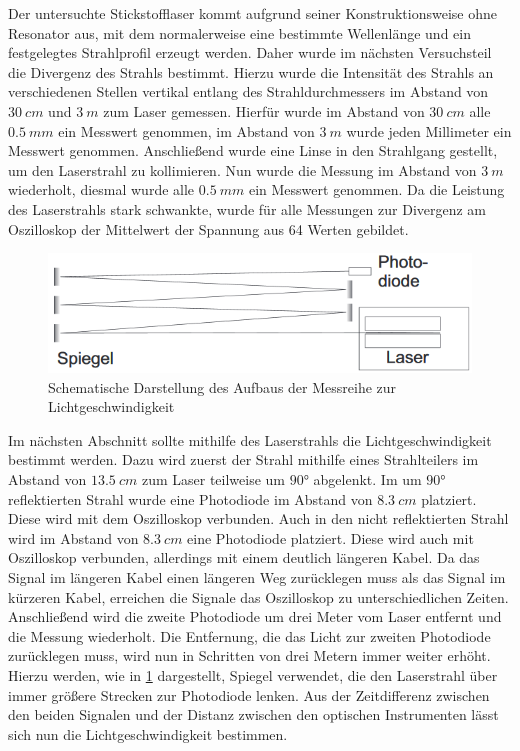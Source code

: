 \documentclass[
	a4paper,
	12pt,
	pagesize,
	ngerman
]{scrartcl}
\begin{document}
Der untersuchte Stickstofflaser kommt aufgrund seiner Konstruktionsweise ohne Resonator aus, mit dem normalerweise eine bestimmte Wellenlänge und ein festgelegtes Strahlprofil erzeugt werden. Daher wurde im nächsten Versuchsteil die Divergenz des Strahls bestimmt. Hierzu wurde die Intensität des Strahls an verschiedenen Stellen vertikal entlang des Strahldurchmessers im Abstand von $\SI{30}{cm}$ und $\SI{3}{m}$ zum Laser gemessen. Hierfür wurde im Abstand von $\SI{30}{cm}$ alle $\SI{0,5}{mm}$ ein Messwert genommen, im Abstand von $\SI{3}{m}$ wurde jeden Millimeter ein Messwert genommen.
Anschließend wurde eine Linse in den Strahlgang gestellt, um den Laserstrahl zu kollimieren. Nun wurde die Messung im Abstand von $\SI{3}{m}$ wiederholt, diesmal wurde alle $\SI{0,5}{mm}$ ein Messwert genommen. Da die Leistung des Laserstrahls stark schwankte, wurde für alle Messungen zur Divergenz am Oszilloskop der Mittelwert der Spannung aus 64 Werten gebildet.

\begin{figure}[h!]
	\centering
	\includegraphics[scale=0.9]{skizze_c.png}
	\caption{Schematische Darstellung des Aufbaus der Messreihe zur Lichtgeschwindigkeit}
	\label{skizze_c}
\end{figure}

Im nächsten Abschnitt sollte mithilfe des Laserstrahls die Lichtgeschwindigkeit bestimmt werden. Dazu wird zuerst der Strahl mithilfe eines Strahlteilers im Abstand von $\SI{13,5}{cm}$ zum Laser teilweise um $90$° abgelenkt. Im um $90$° reflektierten Strahl wurde eine Photodiode im Abstand von $\SI{8,3}{cm}$ platziert. Diese wird mit dem Oszilloskop verbunden. Auch in den nicht reflektierten Strahl wird im Abstand von $\SI{8,3}{cm}$ eine Photodiode platziert. Diese wird auch mit Oszilloskop verbunden, allerdings mit einem deutlich längeren Kabel. Da das Signal im längeren Kabel einen längeren Weg zurücklegen muss als das Signal im kürzeren Kabel, erreichen die Signale das Oszilloskop zu unterschiedlichen Zeiten.
Anschließend wird die zweite Photodiode um drei Meter vom Laser entfernt und die Messung wiederholt. Die Entfernung, die das Licht zur zweiten Photodiode zurücklegen muss, wird nun in Schritten von drei Metern immer weiter erhöht. Hierzu werden, wie in \cref{skizze_c} dargestellt, Spiegel verwendet, die den Laserstrahl über immer größere Strecken zur Photodiode lenken.
Aus der Zeitdifferenz zwischen den beiden Signalen und der Distanz zwischen den optischen Instrumenten lässt sich nun die Lichtgeschwindigkeit bestimmen.
\end{document}
